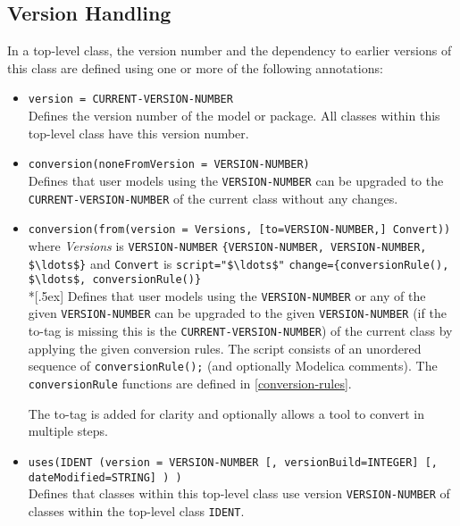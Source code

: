 \subsection{Version Handling}\label{version-handling}

In a top-level class, the version number and the dependency to earlier versions of this class are defined using one or more of the following annotations:
\begin{itemize}
\item
  \lstinline!version = CURRENT-VERSION-NUMBER!\\
  Defines the version number of the model or package.
  All classes within this top-level class have this version number.
\item
  \lstinline!conversion(noneFromVersion = VERSION-NUMBER)!\\
  Defines that user models using the \lstinline!VERSION-NUMBER! can be upgraded to the \lstinline!CURRENT-VERSION-NUMBER! of the current class without any changes.
\item
  \lstinline!conversion(from(version = Versions, [to=VERSION-NUMBER,] Convert))!\\
  where \emph{Versions} is \lstinline!VERSION-NUMBER! \textbar{} \lstinline!{VERSION-NUMBER, VERSION-NUMBER, $\ldots$}! and \lstinline!Convert! is \lstinline!script="$\ldots$"! \textbar{} \lstinline!change={conversionRule(), $\ldots$, conversionRule()}!\\*[.5ex]
  Defines that user models using the \lstinline!VERSION-NUMBER! or any of the given \lstinline!VERSION-NUMBER! can be upgraded to the given \lstinline!VERSION-NUMBER! (if the to-tag is missing this is the \lstinline!CURRENT-VERSION-NUMBER!) of the current class by applying the given conversion rules.
  The script consists of an unordered sequence of \lstinline!conversionRule();! (and optionally Modelica comments).
  The \lstinline!conversionRule! functions are defined in \cref{conversion-rules}.

  \begin{nonnormative}
  The to-tag is added for clarity and optionally allows a tool to convert in multiple steps.
  \end{nonnormative}
\item
  \lstinline!uses(IDENT (version = VERSION-NUMBER [, versionBuild=INTEGER] [, dateModified=STRING] ) )!\\
  Defines that classes within this top-level class use version \lstinline!VERSION-NUMBER! of classes within the top-level class \lstinline!IDENT!.
\end{itemize}

